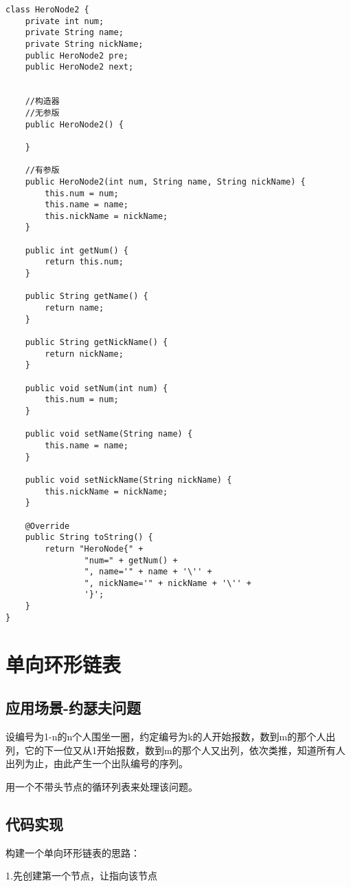 \documentclass[a4paper]{report}
\begin{document}
\begin{lstlisting}
class HeroNode2 {
    private int num;
    private String name;
    private String nickName;
    public HeroNode2 pre;
    public HeroNode2 next;


    //构造器
    //无参版
    public HeroNode2() {

    }

    //有参版
    public HeroNode2(int num, String name, String nickName) {
        this.num = num;
        this.name = name;
        this.nickName = nickName;
    }

    public int getNum() {
        return this.num;
    }

    public String getName() {
        return name;
    }

    public String getNickName() {
        return nickName;
    }

    public void setNum(int num) {
        this.num = num;
    }

    public void setName(String name) {
        this.name = name;
    }

    public void setNickName(String nickName) {
        this.nickName = nickName;
    }

    @Override
    public String toString() {
        return "HeroNode{" +
                "num=" + getNum() +
                ", name='" + name + '\'' +
                ", nickName='" + nickName + '\'' +
                '}';
    }
}
\end{lstlisting}

\section{单向环形链表}
\subsection{应用场景-约瑟夫问题}

设编号为1-n的n个人围坐一圈，约定编号为k的人开始报数，数到m的那个人出列，它的下一位又从1开始报数，数到m的那个人又出列，依次类推，知道所有人出列为止，由此产生一个出队编号的序列。

用一个不带头节点的循环列表来处理该问题。

\subsection{代码实现}

构建一个单向环形链表的思路：

1.先创建第一个节点，让指向该节点
\end{document}

